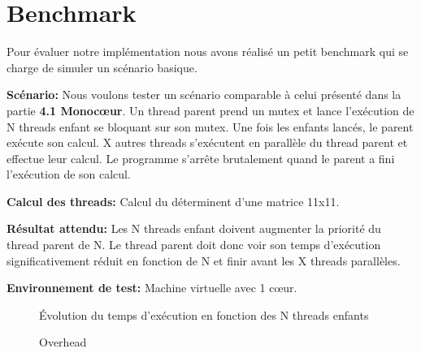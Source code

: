 \section{Benchmark}

Pour évaluer notre implémentation nous avons réalisé un petit benchmark qui se charge de simuler un
scénario basique.

\noindent \textbf{Scénario:}
Nous voulons tester un scénario comparable à celui présenté dans la partie \textbf{4.1 Monocœur}.
Un thread parent prend un mutex et lance l'exécution de N threads enfant se bloquant sur son mutex.
Une fois les enfants lancés, le parent exécute son calcul.
X autres threads s'exécutent en parallèle du thread parent et effectue leur calcul.
Le programme s'arrête brutalement quand le parent a fini l'exécution de son calcul.

\noindent \textbf{Calcul des threads:} 
Calcul du déterminent d'une matrice 11x11.

\noindent \textbf{Résultat attendu:}
Les N threads enfant doivent augmenter la priorité du thread parent de N. Le thread parent doit donc voir son temps d'exécution significativement réduit en fonction de N et finir avant les X threads parallèles.

\noindent \textbf{Environnement de test:}
Machine virtuelle avec 1 cœur.


\begin{figure}[h!]
	\centering
	\caption{Évolution du temps d'exécution en fonction des N threads enfants}
	\label{fig:result}
\end{figure}


\begin{figure}[h!]
	\caption{Overhead}
	\label{fig:overhead}
\end{figure}



